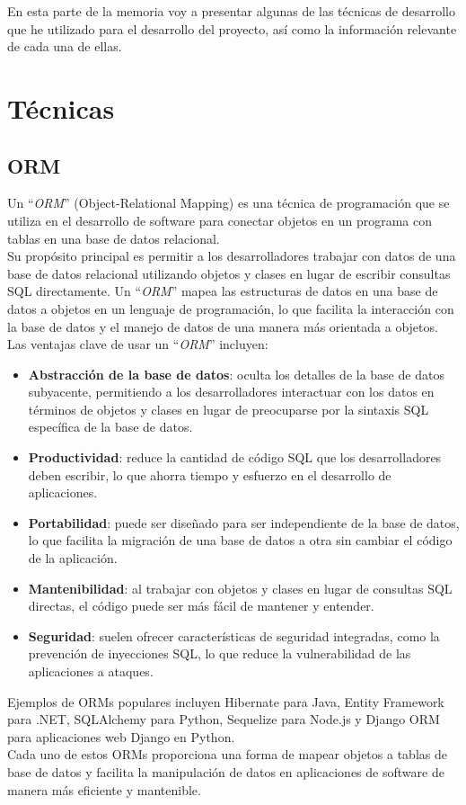 
En esta parte de la memoria voy a presentar algunas de las técnicas de desarrollo 
que he utilizado para el desarrollo del proyecto, así como la información relevante 
de cada una de ellas.

\section{Técnicas}

\subsection{ORM~\cite{fowler2012patterns}}
\label{ORM}
Un ``\emph{ORM}'' (Object-Relational Mapping) es una técnica de programación que se 
utiliza en el desarrollo de software para conectar objetos en un programa 
con tablas en una base de datos relacional. \\
Su propósito principal es permitir a los desarrolladores trabajar con datos de una 
base de datos relacional utilizando objetos y clases en lugar de escribir consultas SQL directamente. 
Un ``\emph{ORM}'' mapea las estructuras de datos en una base de datos a objetos en un 
lenguaje de programación, lo que facilita la interacción con la base de datos y el 
manejo de datos de una manera más orientada a objetos.
Las ventajas clave de usar un ``\emph{ORM}'' incluyen:
\begin{itemize}
    \item \textbf{Abstracción de la base de datos}: oculta los detalles de la base de datos subyacente, 
    permitiendo a los desarrolladores interactuar con los datos en términos de objetos y clases 
    en lugar de preocuparse por la sintaxis SQL específica de la base de datos.
    \item \textbf{Productividad}: reduce la cantidad de código SQL que los desarrolladores deben escribir, 
    lo que ahorra tiempo y esfuerzo en el desarrollo de aplicaciones.
    \item \textbf{Portabilidad}: puede ser diseñado para ser independiente de la base de datos, 
    lo que facilita la migración de una base de datos a otra sin cambiar el código de la aplicación.
    \item \textbf{Mantenibilidad}: al trabajar con objetos y clases en lugar de consultas SQL directas, 
    el código puede ser más fácil de mantener y entender.
    \item \textbf{Seguridad}: suelen ofrecer características de seguridad integradas, 
    como la prevención de inyecciones SQL, lo que reduce la vulnerabilidad de las aplicaciones a ataques. 
\end{itemize}
Ejemplos de ORMs populares incluyen Hibernate para Java, Entity Framework para .NET, 
SQLAlchemy para Python, Sequelize para Node.js y Django ORM para aplicaciones web Django en Python. \\
Cada uno de estos ORMs proporciona una forma de mapear objetos a tablas de base de datos y facilita 
la manipulación de datos en aplicaciones de software de manera más eficiente y mantenible.

